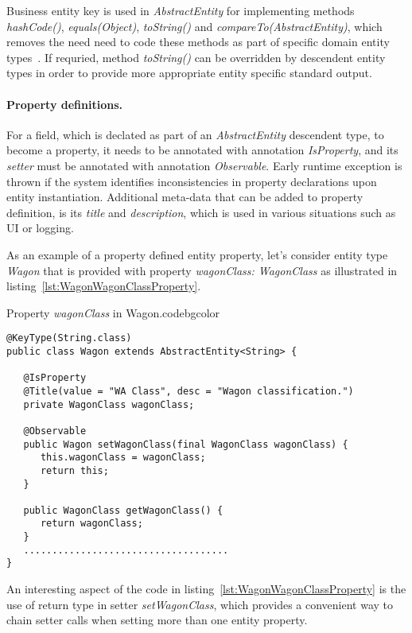   Business entity key is used in \emph{AbstractEntity} for implementing methods \emph{hashCode()}, \emph{equals(Object)}, \emph{toString()} and \emph{compareTo(AbstractEntity)}, which removes the need  need to code these methods as part of specific domain entity types~\cite{Bloch2008}.
  If requried, method \emph{toString()} can be overridden by descendent entity types in order to provide more appropriate entity specific standard output.

  \paragraph*{Property definitions.}
  
  For a field, which is declated as part of an \emph{AbstractEntity} descendent type, to become a property, it needs to be annotated with annotation \emph{IsProperty}, and its \emph{setter} must be annotated with annotation \emph{Observable}.
  Early runtime exception is thrown if the system identifies inconsistencies in property declarations upon entity instantiation.
  Additional meta-data that can be added to property definition, is its \emph{title} and \emph{description}, which is used in various situations such as UI or logging.

  As an example of a property defined entity property, let's consider entity type \emph{Wagon} that is provided with property \emph{wagonClass: WagonClass} as illustrated in listing~\ref{lst:WagonWagonClassProperty}.

  \begin{code}{Property \emph{wagonClass} in Wagon.}{\label{lst:WagonWagonClassProperty}}{codebgcolor}
    \begin{lstlisting}
@KeyType(String.class)
public class Wagon extends AbstractEntity<String> {

   @IsProperty
   @Title(value = "WA Class", desc = "Wagon classification.")
   private WagonClass wagonClass;

   @Observable
   public Wagon setWagonClass(final WagonClass wagonClass) {
      this.wagonClass = wagonClass;
      return this;
   }
  
   public WagonClass getWagonClass() {
      return wagonClass;
   }
   ....................................
}
    \end{lstlisting}
  \end{code}

  An interesting aspect of the code in listing~\ref{lst:WagonWagonClassProperty} is the use of return type in setter \emph{setWagonClass}, which provides a convenient way to chain setter calls when setting more than one entity property.

